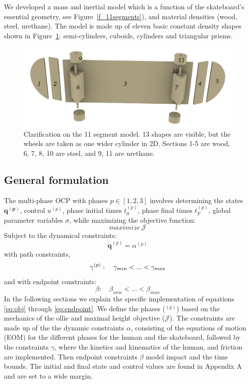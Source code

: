 \documentclass[default,iicol]{sn-jnl}
\begin{document}
We developed a mass and inertial model which is a function of the skateboard's
essential geometry, see Figure~\ref{f_11segments}), and material densities
(wood, steel, urethane). The model is made up of eleven basic constant density
shapes shown in Figure~\ref{f_basicshapes}: semi-cylinders, cuboids, cylinders
and triangular prisms.
%
\begin{figure}
  \centering
  \includegraphics[width = 0.5 \textwidth]{figure/Basicshapes.png}
  \caption[Exploded 11 segment model]{Clarification on the 11 segment model.
    13 shapes are visible, but the wheels are taken as one wider cylinder in
    2D. Sections 1-5 are wood, 6, 7, 8, 10 are steel, and 9, 11 are urethane.}
  \label{f_basicshapes}
\end{figure}

\subsection{General formulation}
The multi-phase OCP with phases $p \in [1,2,3]$ involves determining the states
$\mathbf{q^{(p)}}$, control $u^{(p)}$, phase initial times $t_0^{(p)}$, phase
final times $t_F^{(p)}$, global parameter variables $\sigma$, while maximizing
the objective function:
\begin{equation}
  maximize\ \mathcal{J}
  \label{eq:obj}
\end{equation}
Subject to the dynamical constraints:
\begin{equation}
  \ddot{\mathbf{q}}^{(p)}=\alpha^{(p)}
\end{equation}
with path constraints,
\begin{equation}
  \gamma^{(p)}:\quad \gamma_{min} < ... < \gamma_{max}\\
\end{equation}
and with endpoint constraints:
\begin{equation}
    \beta:\quad \beta_{min} < ... < \beta_{max}
    \label{eq:endpoint}
\end{equation}
In the following sections we explain the specific implementation of equations
\ref{eq:obj} through \ref{eq:endpoint}.
We define the phases ($^{(p)}$) based on the mechanics of the ollie and maximal
height objective ($\mathcal{J}$).
The constraints are made up of the the dynamic constraints $\alpha$, consisting
of the equations of motion (EOM) for the different phases for the human and the
skateboard, followed by the constraints $\gamma$, where the kinetics and
kinematics of the human, and friction are implemented.
Then endpoint constraints $\beta$ model impact and the time bounds.
The initial and final state and control values are found in Appendix A and are
set to a wide margin.
\end{document}

